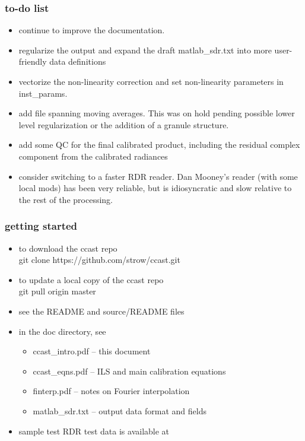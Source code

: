 \documentclass[11pt]{beamer}
\begin{document}
\begin{frame}
\frametitle{to-do list}

\begin{itemize}
  \item continue to improve the documentation.

  \item regularize the output and expand the draft matlab\_sdr.txt
    into more user-friendly data definitions

  \item vectorize the non-linearity correction and set non-linearity
    parameters in inst\_params.

  \item add file spanning moving averages.  This was on hold pending
    possible lower level regularization or the addition of a granule
    structure.

  \item add some QC for the final calibrated product, including the
    residual complex component from the calibrated radiances

  \item consider switching to a faster RDR reader.  Dan Mooney's
    reader (with some local mods) has been very reliable, but is
    idiosyncratic and slow relative to the rest of the processing.

\end{itemize}

\end{frame}
\begin{frame}
\frametitle{getting started}

\begin{itemize} 
   \item to download the ccast repo \\ 
     \hspace{10pt} git clone https://github.com/strow/ccast.git
   \item to update a local copy of the ccast repo \\ 
     \hspace{10pt} git pull origin master
   \item see the README and source/README files
   \item in the doc directory, see
     \begin{itemize}
       \item ccast\_intro.pdf -- this document
       \item ccast\_eqns.pdf -- ILS and main calibration equations
       \item finterp.pdf -- notes on Fourier interpolation
       \item matlab\_sdr.txt -- output data format and fields
     \end{itemize} 
   \item sample test RDR test data is available at
\end{itemize} 

\end{frame}
\end{document}
